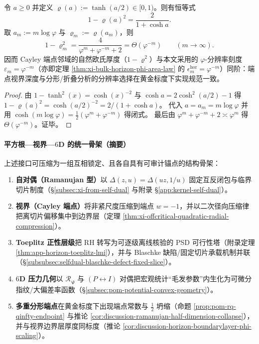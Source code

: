 \begin{corollary}\label{cor:discussion-horizon-boundarylayer-phi-scaling}
令 \(a\ge 0\) 并定义 \(\varrho(a):=\tanh(a/2)\in[0,1)\)。则有恒等式
\[
1-\varrho(a)^2=\frac{2}{1+\cosh a}.
\]
取 \(a_m:=m\log\varphi\) 与 \(\varrho_m:=\varrho(a_m)\)，则
\[
1-\varrho_m^2=\frac{4}{\varphi^{m}+\varphi^{-m}+2}
=\Theta(\varphi^{-m})\qquad(m\to\infty).
\]
因而 Cayley 端点邻域的自然欧氏厚度（\(1-\varrho^2\)）与本文采用的 \(\varphi\)-分辨率刻度 \(\varepsilon_m=\varphi^{-m}\)（亦即定理 \ref{thm:xi-bulk-horizon-phi-area-law} 的 \(\epsilon_m^{\mathrm{hor}}=\varphi^{-m}\)）同阶：端点视界深度与分形/折叠分析的分辨率选择在黄金标度下实现规范一致。
\end{corollary}
\begin{proof}
由 \(1-\tanh^2(x)=\cosh(x)^{-2}\) 与 \(\cosh a=2\cosh^2(a/2)-1\) 得
\(
1-\varrho(a)^2=\cosh(a/2)^{-2}=2/(1+\cosh a)
\)。
代入 \(a=a_m=m\log\varphi\) 并用 \(\cosh(m\log\varphi)=\frac12(\varphi^{m}+\varphi^{-m})\) 得闭式。
最后由 \(\varphi^{m}+\varphi^{-m}+2\asymp\varphi^{m}\) 得 \(\Theta(\varphi^{-m})\)。证毕。
\end{proof}

\paragraph{平方根—视界—\(6\)D 的统一骨架（摘要）}
上述接口可压缩为一组互相锁定、且各自具有可审计锚点的结构骨架：
\begin{enumerate}
  \item \textbf{自对偶（Ramanujan 型）}以 \(\Delta(z,u)=\Delta(uz,1/u)\) 固定互反闭包与临界切片制度（\S\ref{subsec:xi-from-self-dual} 与附录 \S\ref{app:kernel-self-dual}）。
  \item \textbf{视界（Cayley 端点）}将非紧尺度压缩到端点 \(w=-1\)，并以二次径向压缩律把离切片偏移集中到边界层（定理 \ref{thm:xi-offcritical-quadratic-radial-compression}）。
  \item \textbf{Toeplitz 正性层级}把 RH 转写为可逐级离线核验的 PSD 可行性塔（附录定理 \ref{thm:app-horizon-toeplitz-lmi}），并与 Blaschke 缺陷/固定切片承载机制并联（\S\ref{subsubsec:selfdual-blaschke-defect-fixed-slice}）。
  \item \textbf{\(6\)D 压力几何}以 \(\mathcal{R}_{\boldsymbol{\varphi}}\) 与 \((P\leftrightarrow I)\) 对偶把宏观统计“毛发参数”内生化为可微分指纹/大偏差率函数（\S\ref{subsec:pom-potential-convex-geometry}）。
  \item \textbf{多重分形端点}在黄金标度下出现端点常数与 \(\tfrac12\) 坍缩（命题 \ref{prop:pom-rq-qinfty-endpoint} 与推论 \ref{cor:discussion-ramanujan-half-dimension-collapse}），并与视界边界层厚度同标度（推论 \ref{cor:discussion-horizon-boundarylayer-phi-scaling}）。
\end{enumerate}

